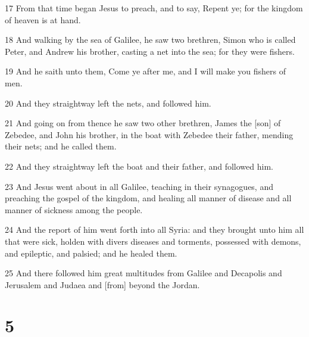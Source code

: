 \par 17 From that time began Jesus to preach, and to say, Repent ye; for the kingdom of heaven is at hand.
\par 18 And walking by the sea of Galilee, he saw two brethren, Simon who is called Peter, and Andrew his brother, casting a net into the sea; for they were fishers.
\par 19 And he saith unto them, Come ye after me, and I will make you fishers of men.
\par 20 And they straightway left the nets, and followed him.
\par 21 And going on from thence he saw two other brethren, James the [son] of Zebedee, and John his brother, in the boat with Zebedee their father, mending their nets; and he called them.
\par 22 And they straightway left the boat and their father, and followed him.
\par 23 And Jesus went about in all Galilee, teaching in their synagogues, and preaching the gospel of the kingdom, and healing all manner of disease and all manner of sickness among the people.
\par 24 And the report of him went forth into all Syria: and they brought unto him all that were sick, holden with divers diseases and torments, possessed with demons, and epileptic, and palsied; and he healed them.
\par 25 And there followed him great multitudes from Galilee and Decapolis and Jerusalem and Judaea and [from] beyond the Jordan.

\chapter{5}

